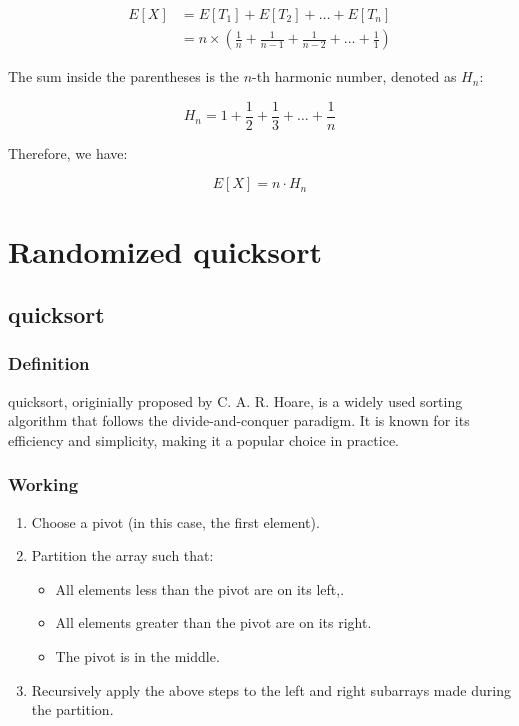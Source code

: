         \[
            \begin{aligned}
                E[X] & = E[T_1] + E[T_2] + \dots + E[T_n]\\
                & = n \times \left(\frac{1}{n} + \frac{1}{n - 1} + \frac{1}{n - 2} + \dots + \frac{1}{1}\right)
            \end{aligned}
        \]

        The sum inside the parentheses is the \(n\)-th harmonic number, denoted as \(H_n\):

        \[
            H_n = 1 + \frac{1}{2} + \frac{1}{3} + \dots + \frac{1}{n}
        \]

        Therefore, we have:

        \[
            E[X] = n \cdot H_n
        \]

\section*{Randomized quicksort}
    \subsection*{quicksort}
        \subsubsection*{Definition}
            quicksort, originially proposed by C. A. R. Hoare, is a widely used sorting algorithm that follows the divide-and-conquer paradigm. It is known for its efficiency and simplicity, making it a popular choice in practice.

        \subsubsection*{Working}
            \begin{enumerate}
                \item Choose a pivot (in this case, the first element).
                \item Partition the array such that:
                \begin{itemize}
                    \item All elements less than the pivot are on its left,.
                    \item All elements greater than the pivot are on its right.
                    \item The pivot is in the middle.
                \end{itemize}
                \item Recursively apply the above steps to the left and right subarrays made during the partition.
            \end{enumerate}

